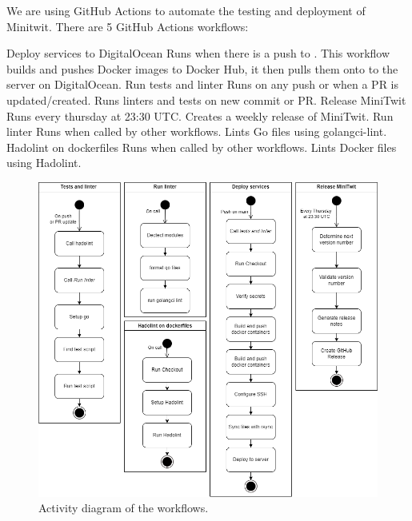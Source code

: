 We are using GitHub Actions to automate the testing and deployment of Minitwit. There are 5 GitHub Actions workflows:

\begin{outline}[enumerate]
    \1 Deploy services to DigitalOcean
        \2 Runs when there is a push to .
        \2 This workflow builds and pushes Docker images to Docker Hub, it then pulls them onto to the server on DigitalOcean.
    \1 Run tests and linter
        \2 Runs on any push or when a PR is updated/created.
        \2 Runs linters and tests on new commit or PR.
    \1 Release MiniTwit
        \2 Runs every thursday at 23:30 UTC.
        \2 Creates a weekly release of MiniTwit.
    \1 Run linter
        \2 Runs when called by other workflows.
        \2 Lints Go files using golangci-lint.
    \1 Hadolint on dockerfiles
        \2 Runs when called by other workflows.
        \2 Lints Docker files using Hadolint.
\end{outline}
\begin{figure}[H]
    \centering
    \includegraphics[width=\textwidth]{images/Worflows.png}
    \caption{Activity diagram of the workflows.}
\end{figure}
